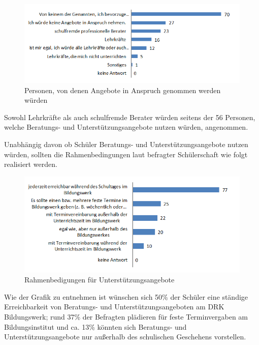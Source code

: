 \begin{figure}[ht]
	\centering
		\includegraphics[width=1.0\textwidth]{images/Von-welchen-Personen-wuerden-unterstuetzende-Angebote-angenommen.png}
	\caption{Personen, von denen Angebote in Anspruch genommen werden würden}
	\label{fig:Von-welchen-Personen-wuerden-unterstuetzende-Angebote-angenommen}
\end{figure}

Sowohl Lehrkräfte als auch schulfremde Berater würden seitens der 56 Personen, welche Beratungs- und Unterstützungsangebote nutzen würden, angenommen. 

Unabhängig davon ob Schüler Beratungs- und Unterstützungsangebote nutzen würden, sollten die Rahmenbedingungen laut befragter Schülerschaft wie folgt realisiert werden. 

\begin{figure}[ht]
	\centering
		\includegraphics[width=1.0\textwidth]{images/Rahmenbedingungen-fuer-Unterstuetzungangebote.png}
	\caption{Rahmenbedigungen für Unterstützungsangebote}
	\label{fig:Rahmenbedingungen-fuer-Unterstuetzungangebote}
\end{figure}

\noindent
Wie der Grafik zu entnehmen ist wünschen sich 50\% der Schüler eine ständige Erreichbarkeit von Beratungs- und Unterstützungsangeboten am DRK Bildungswerk; rund 37\% der Befragten plädieren für feste Terminvergaben am Bildungsinstitut und ca. 13\% könnten sich Beratungs- und Unterstützungsangebote nur außerhalb des schulischen Geschehens vorstellen.\\

